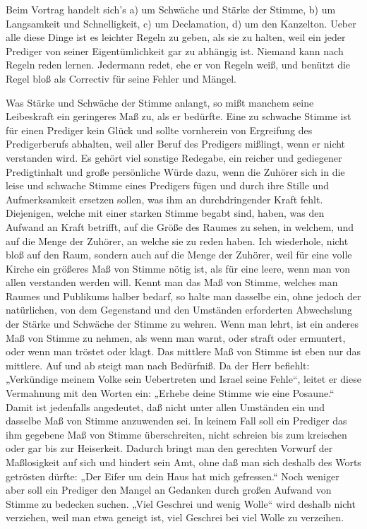 Beim Vortrag handelt sich’s a) um Schwäche und Stärke der Stimme, b) um Langsamkeit und Schnelligkeit, c) um Declamation, d) um den Kanzelton. Ueber alle diese Dinge ist es leichter Regeln zu geben, als sie zu halten, weil ein jeder Prediger von seiner Eigentümlichkeit gar zu abhängig ist. Niemand kann nach Regeln reden lernen. Jedermann redet, ehe er von Regeln weiß, und benützt die Regel bloß als Correctiv für seine Fehler und Mängel.

Was Stärke und Schwäche der Stimme anlangt, so mißt manchem seine Leibeskraft ein geringeres Maß zu, als
er bedürfte. Eine zu schwache Stimme ist für einen Prediger kein Glück und sollte vornherein von Ergreifung des Predigerberufs abhalten, weil aller Beruf des Predigers mißlingt, wenn er nicht verstanden wird. Es gehört viel sonstige Redegabe, ein reicher und gediegener Predigtinhalt und große persönliche Würde dazu, wenn die Zuhörer sich in die leise und schwache Stimme eines Predigers fügen und durch ihre Stille und Aufmerksamkeit ersetzen sollen, was ihm an durchdringender Kraft fehlt. Diejenigen, welche mit einer starken Stimme begabt sind, haben, was den Aufwand an Kraft betrifft, auf die Größe des Raumes zu sehen, in welchem, und auf die Menge der Zuhörer, an welche sie zu reden haben. Ich wiederhole, nicht bloß auf den Raum, sondern auch auf die Menge der Zuhörer, weil für eine volle Kirche ein größeres Maß von Stimme nötig ist, als für eine leere, wenn man von allen verstanden werden will. Kennt man das Maß von Stimme, welches man Raumes und Publikums halber bedarf, so halte man dasselbe ein, ohne jedoch der natürlichen, von dem Gegenstand und den Umständen erforderten Abwechslung der Stärke und Schwäche der Stimme zu wehren. Wenn man lehrt, ist ein anderes Maß von Stimme zu nehmen, als wenn man warnt, oder straft oder ermuntert, oder wenn man tröstet oder klagt. Das mittlere Maß von Stimme ist eben nur das mittlere. Auf und ab steigt man nach Bedürfniß. Da der Herr befiehlt: „Verkündige meinem Volke sein Uebertreten und Israel seine Fehle“, leitet er diese Vermahnung mit den Worten ein: „Erhebe deine Stimme wie eine Posaune.“ Damit ist jedenfalls
angedeutet, daß nicht unter allen Umständen ein und dasselbe Maß von Stimme anzuwenden sei. In keinem Fall soll ein Prediger das ihm gegebene Maß von Stimme überschreiten, nicht schreien bis zum kreischen oder gar bis zur Heiserkeit. Dadurch bringt man den gerechten Vorwurf der Maßlosigkeit auf sich und hindert sein Amt, ohne daß man sich deshalb des Worts getrösten dürfte: „Der Eifer um dein Haus hat mich gefressen.“ Noch weniger aber soll ein Prediger den Mangel an Gedanken durch großen Aufwand von Stimme zu bedecken suchen. „Viel Geschrei und wenig Wolle“ wird deshalb nicht verziehen, weil man etwa geneigt ist, viel Geschrei bei viel Wolle zu verzeihen.


